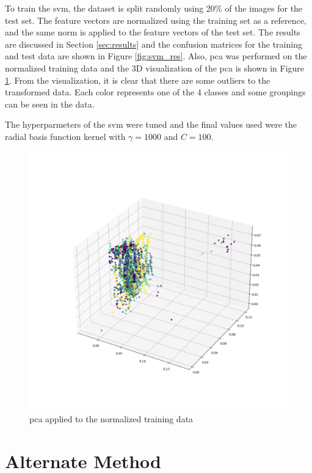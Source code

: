\documentclass[10pt,twocolumn,letterpaper]{article}
\begin{document}
To train the \acrshort{svm}, the dataset is split randomly using 20\% of the images for the test set. The feature vectors are normalized using the training set as a reference, and the same norm is applied to the feature vectors of the test set. The results are discussed in Section \ref{sec:results} and the confusion matrices for the training and test data are shown in Figure \ref{fig:svm_res}. Also, \acrfull{pca} was performed on the normalized training data and the 3D visualization of the \acrshort{pca} is shown in Figure \ref{fig:pca}. From the visualization, it is clear that there are some outliers to the transformed data. Each color represents one of the 4 classes and some groupings can be seen in the data.

The hyperparmeters of the \acrshort{svm} were tuned and the final values used were the radial basis function kernel with $\gamma = 1000$ and $C = 100$.

\begin{figure}[H]
  \centering
   \includegraphics[width=0.9\linewidth, trim={14em, 12em, 9em, 15em}, clip]{pca}
   \caption{\acrshort{pca} applied to the normalized training data}
   \label{fig:pca}
\end{figure}

\section{Alternate Method}
\end{document}
